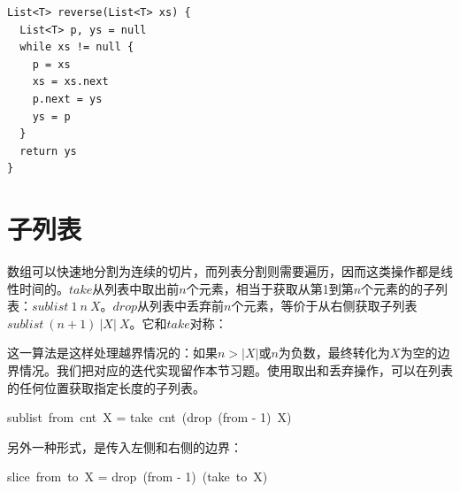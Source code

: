 \documentclass[b5paper]{ctexart}
\begin{document}
\begin{lstlisting}[language=Bourbaki]
List<T> reverse(List<T> xs) {
  List<T> p, ys = null
  while xs != null {
    p = xs
    xs = xs.next
    p.next = ys
    ys = p
  }
  return ys
}
\end{lstlisting}

\begin{Exercise}
\end{Exercise}

\section{子列表}
   

数组可以快速地分割为连续的切片，而列表分割则需要遍历，因而这类操作都是线性时间的。$take$从列表中取出前$n$个元素，相当于获取从第1到第$n$个元素的的子列表：$sublist\ 1\ n\ X$。$drop$从列表中丢弃前$n$个元素，等价于从右侧获取子列表$sublist\ (n+1)\ |X|\ X$。它和$take$对称：

\be
{}
\ee

这一算法是这样处理越界情况的：如果$n > |X|$或$n$为负数，最终转化为$X$为空的边界情况。我们把对应的迭代实现留作本节习题。使用取出和丢弃操作，可以在列表的任何位置获取指定长度的子列表。

\be
sublist\ from\ cnt\ X = take\ cnt\ (drop\ (from - 1)\ X)
\ee

另外一种形式，是传入左侧和右侧的边界：

\be
slice\ from\ to\ X = drop\ (from - 1)\ (take\ to\ X)
\ee
\end{document}
